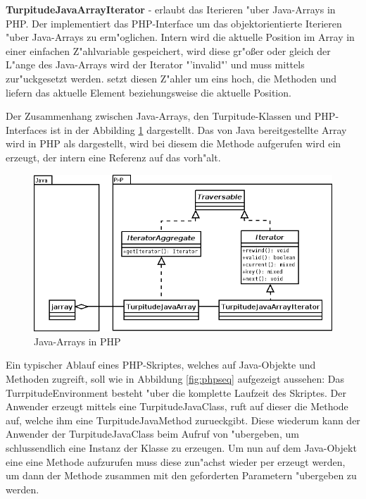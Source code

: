 \textbf{TurpitudeJavaArrayIterator} - erlaubt das Iterieren "uber Java-Arrays in PHP. Der  implementiert
das PHP-Interface  um das objektorientierte Iterieren "uber Java-Arrays zu erm"oglichen. Intern wird die aktuelle
Position im Array in einer einfachen Z"ahlvariable gespeichert, wird diese gr"o\ss er oder gleich der L"ange des Java-Arrays wird der
Iterator "'invalid"' und muss mittels  zur"uckgesetzt werden.  setzt diesen Z"ahler um eins hoch, die Methoden
 und  liefern das aktuelle Element beziehungsweise die aktuelle Position.

Der Zusammenhang zwischen Java-Arrays, den Turpitude-Klassen und PHP-Interfaces ist in der Abbilding \ref{fig:javaarrays} dargestellt.
Das von Java bereitgestellte Array wird in PHP als  dargestellt, wird bei diesem die Methode
 aufgerufen wird ein  erzeugt, der intern eine Referenz auf das 
vorh"alt. 

\begin{figure}[h]
\includegraphics[width=\textwidth]{chap1/img/javaarrays.png}
\caption{Java-Arrays in PHP}
\label{fig:javaarrays}
\end{figure}

Ein typischer Ablauf eines PHP-Skriptes, welches auf Java-Objekte und Methoden zugreift, soll wie in Abbildung \ref{fig:phpseq} aufgezeigt 
aussehen:
Das TurrpitudeEnvironment besteht "uber die komplette Laufzeit des Skriptes. Der Anwender erzeugt mittels  eine
TurpitudeJavaClass, ruft auf dieser die Methode  auf, welche ihm eine TurpitudeJavaMethod zurueckgibt. Diese wiederum 
kann der Anwender der TurpitudeJavaClass beim Aufruf von  "ubergeben, um schlussendlich eine Instanz der Klasse zu erzeugen.
Um nun auf dem Java-Objekt eine eine Methode aufzurufen muss diese zun"achst wieder per  erzeugt werden, um dann der
Methode  zusammen mit den geforderten Parametern "ubergeben zu werden.

